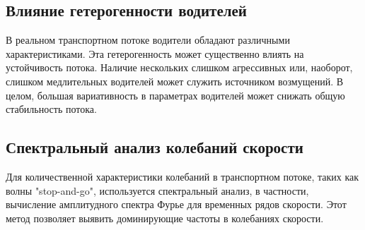 \documentclass[12pt, a4paper]{article}
\begin{document}

\subsection{Влияние гетерогенности водителей}
\label{subsec:driver_heterogeneity}

В реальном транспортном потоке водители обладают различными характеристиками. Эта гетерогенность может существенно влиять на устойчивость потока. Наличие нескольких слишком агрессивных или, наоборот, слишком медлительных водителей может служить источником возмущений.
В целом, большая вариативность в параметрах водителей может снижать общую стабильность потока.

\subsection{Спектральный анализ колебаний скорости}
\label{subsec:spectral_analysis_velocity}

Для количественной характеристики колебаний в транспортном потоке, таких как волны "stop-and-go", используется спектральный анализ, в частности, вычисление амплитудного спектра Фурье для временных рядов скорости. Этот метод позволяет выявить доминирующие частоты в колебаниях скорости.

\end{document}

